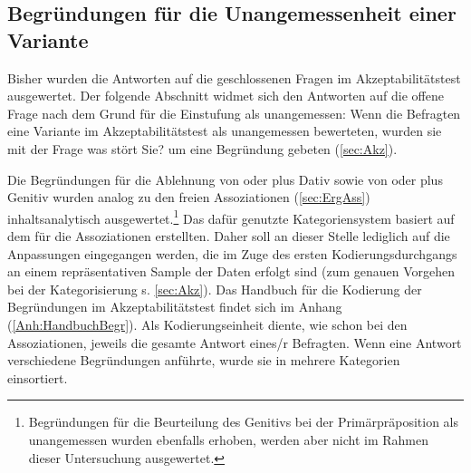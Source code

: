 \subsection{Begründungen für die Unangemessenheit einer Variante}
\label{sec:Begruendungen}
Bisher wurden die Antworten auf die geschlossenen Fragen im Akzeptabilitätstest ausgewertet. 
Der folgende Abschnitt widmet sich den Antworten auf die offene Frage nach dem Grund für die Einstufung als unangemessen: 
Wenn die Befragten eine Variante im Akzeptabilitätstest als unangemessen bewerteten, wurden sie mit der Frage \glqq was stört Sie?\grqq{} um eine Begründung gebeten (\autoref{sec:Akz}). 

Die Begründungen für die Ablehnung von \wegen{} oder \waehrend{} plus Dativ sowie von \dank{} oder \gegenueber{} plus Genitiv wurden analog zu den freien Assoziationen (\autoref{sec:ErgAss}) inhaltsanalytisch ausgewertet.\footnote{Begründungen für die Beurteilung des Genitivs bei der Primärpräposition  als unangemessen wurden ebenfalls erhoben, werden aber nicht im Rahmen dieser Untersuchung ausgewertet.}
Das dafür genutzte Kategoriensystem basiert auf dem für die Assoziationen erstellten. 
Daher soll an dieser Stelle lediglich auf die Anpassungen eingegangen werden, die im Zuge des ersten Kodierungsdurchgangs an einem repräsentativen Sample der Daten erfolgt sind (zum genauen Vorgehen bei der Kategorisierung s. \autoref{sec:Akz}). 
Das Handbuch für die Kodierung der Begründungen im Akzeptabilitätstest findet sich im Anhang (\autoref{Anh:HandbuchBegr}). 
Als Kodierungseinheit diente, wie schon bei den Assoziationen, jeweils die gesamte Antwort eines/r Befragten. 
Wenn eine Antwort verschiedene Begründungen anführte, wurde sie in mehrere Kategorien einsortiert. 

